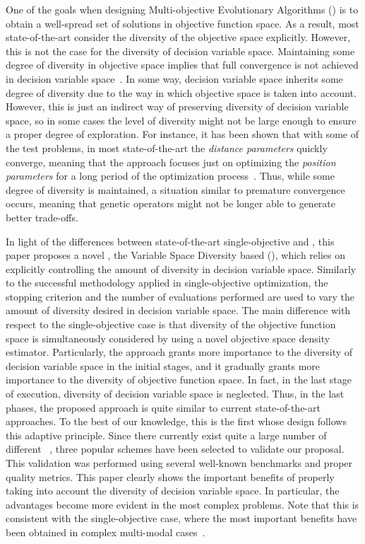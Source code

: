 One of the goals when designing Multi-objective Evolutionary Algorithms (\MOEAS{}) is to obtain a well-spread 
set of solutions in objective function space.
%
As a result, most state-of-the-art \MOEAS{} consider the diversity of the objective space explicitly.
%
However, this is not the case for the diversity of decision variable space.
%
Maintaining some degree of diversity in objective space implies that full convergence 
is not achieved in decision variable space~\cite{Joel:GDE3_CEC09}.
%
In some way, decision variable space inherits some degree of diversity due to the way in which objective space is 
taken into account. 
%
However, this is just an indirect way of preserving diversity of decision variable space, so 
in some cases the level of diversity might not be large enough to ensure a proper degree of exploration.
%
For instance, it has been shown that with some of the \WFG{} test problems, in most state-of-the-art \MOEAS{} 
the \textit{distance parameters} quickly converge, meaning that the approach focuses just on optimizing the 
\textit{position parameters} for a long period of the optimization process~\cite{Joel:GDE3_CEC09}.
%
Thus, while some degree of diversity is maintained, a situation similar to premature convergence occurs,
meaning that genetic operators might not be longer able to generate better trade-offs. 

In light of the differences between state-of-the-art single-objective \EAS{} and \MOEAS{}, 
this paper proposes a novel \MOEA{}, the Variable Space Diversity based \MOEA{} (\VSDMOEA{}), 
which relies on explicitly controlling the amount of diversity in decision variable space.
%
Similarly to the successful methodology applied in single-objective optimization, the stopping criterion and the 
number of evaluations performed are used to vary the amount of diversity desired in decision variable space.
%
The main difference with respect to the single-objective case is that diversity of the objective function space 
is simultaneously considered by using a novel objective space density estimator.
%
Particularly, the approach grants more importance to the diversity of decision variable space in the initial stages, and 
it gradually grants more importance to the diversity of objective function space.
%
In fact, in the last stage of execution, diversity of decision variable space is neglected. Thus, 
in the last phases, the proposed approach is quite similar to current state-of-the-art approaches.
%
To the best of our knowledge, this is the first \MOEA{} whose design follows this adaptive principle.
%
Since there currently exist quite a large number of different \MOEAS{}~\cite{Joel:MOEA_APPLICATIONS_BOOK_KCTAN}, 
three popular schemes have been selected to validate our proposal.
%
This validation was performed using several well-known benchmarks and proper quality metrics.
%
This paper clearly shows the important benefits of properly taking into account the diversity of decision variable space.
%
In particular, the advantages become more evident in the most complex problems.
%
Note that this is consistent with the single-objective case, where the most important benefits have been obtained
in complex multi-modal cases~\cite{Segura:17}.

